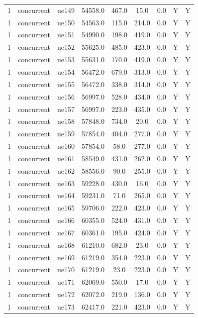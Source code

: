 \begin{table}[ht]
\begin{tabular}{|c|c|c|c|c|c|c|c|c|}
1 & concurrent & ue149 & 54558.0 & 467.0 & 15.0 & 0.0 & Y & Y \\
1 & concurrent & ue150 & 54563.0 & 115.0 & 214.0 & 0.0 & Y & Y \\
1 & concurrent & ue151 & 54990.0 & 198.0 & 419.0 & 0.0 & Y & Y \\
1 & concurrent & ue152 & 55625.0 & 485.0 & 423.0 & 0.0 & Y & Y \\
1 & concurrent & ue153 & 55631.0 & 170.0 & 419.0 & 0.0 & Y & Y \\
1 & concurrent & ue154 & 56472.0 & 679.0 & 313.0 & 0.0 & Y & Y \\
1 & concurrent & ue155 & 56472.0 & 338.0 & 314.0 & 0.0 & Y & Y \\
1 & concurrent & ue156 & 56997.0 & 528.0 & 434.0 & 0.0 & Y & Y \\
1 & concurrent & ue157 & 56997.0 & 223.0 & 435.0 & 0.0 & Y & Y \\
1 & concurrent & ue158 & 57848.0 & 734.0 & 20.0 & 0.0 & Y & Y \\
1 & concurrent & ue159 & 57854.0 & 404.0 & 277.0 & 0.0 & Y & Y \\
1 & concurrent & ue160 & 57854.0 & 58.0 & 277.0 & 0.0 & Y & Y \\
1 & concurrent & ue161 & 58549.0 & 431.0 & 262.0 & 0.0 & Y & Y \\
1 & concurrent & ue162 & 58556.0 & 90.0 & 255.0 & 0.0 & Y & Y \\
1 & concurrent & ue163 & 59228.0 & 430.0 & 16.0 & 0.0 & Y & Y \\
1 & concurrent & ue164 & 59231.0 & 71.0 & 265.0 & 0.0 & Y & Y \\
1 & concurrent & ue165 & 59706.0 & 222.0 & 423.0 & 0.0 & Y & Y \\
1 & concurrent & ue166 & 60355.0 & 524.0 & 431.0 & 0.0 & Y & Y \\
1 & concurrent & ue167 & 60361.0 & 195.0 & 424.0 & 0.0 & Y & Y \\
1 & concurrent & ue168 & 61210.0 & 682.0 & 23.0 & 0.0 & Y & Y \\
1 & concurrent & ue169 & 61219.0 & 354.0 & 223.0 & 0.0 & Y & Y \\
1 & concurrent & ue170 & 61219.0 & 23.0 & 223.0 & 0.0 & Y & Y \\
1 & concurrent & ue171 & 62069.0 & 550.0 & 17.0 & 0.0 & Y & Y \\
1 & concurrent & ue172 & 62072.0 & 219.0 & 136.0 & 0.0 & Y & Y \\
1 & concurrent & ue173 & 62417.0 & 221.0 & 423.0 & 0.0 & Y & Y \\

\end{tabular}
\end{table}
